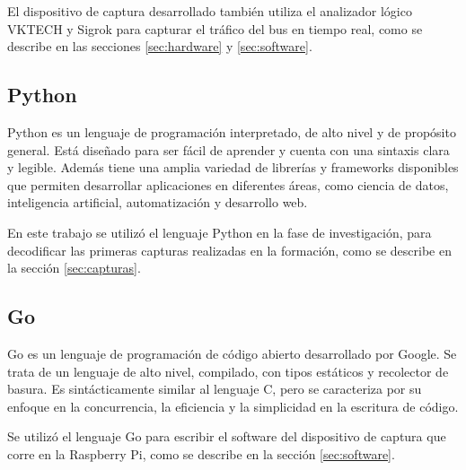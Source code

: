 El dispositivo de captura desarrollado también utiliza el analizador lógico VKTECH y Sigrok para capturar el tráfico del bus en tiempo real, como se describe en las secciones \ref{sec:hardware} y  \ref{sec:software}.

\subsection{Python}

Python \cite{web:python} es un lenguaje de programación interpretado, de alto nivel y de propósito general. Está diseñado para ser fácil de aprender y cuenta con una sintaxis clara y legible.
Además tiene una amplia variedad de librerías y frameworks disponibles que permiten desarrollar aplicaciones en diferentes áreas, como ciencia de datos, inteligencia artificial, automatización y desarrollo web.

En este trabajo se utilizó el lenguaje Python en la fase de investigación, para decodificar las primeras capturas realizadas en la formación, como se describe en la sección \ref{sec:capturas}.

\subsection{Go}

Go \cite{web:go} es un lenguaje de programación de código abierto desarrollado por Google.
Se trata de un lenguaje de alto nivel, compilado, con tipos estáticos y recolector de basura.
Es sintácticamente similar al lenguaje C, pero se caracteriza por su enfoque en la concurrencia, la eficiencia y la simplicidad en la escritura de código.

Se utilizó el lenguaje Go para escribir el software del dispositivo de captura que corre en la Raspberry Pi, como se describe en la sección \ref{sec:software}.
